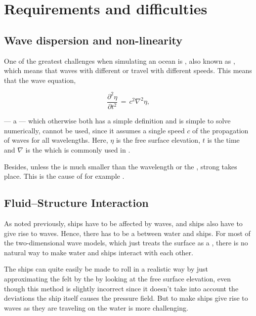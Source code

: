 \chapter{Requirements and difficulties}

\section{Wave dispersion and non-linearity}

One of the greatest challenges when simulating an ocean is , also known as , which means that waves with different \wavelengths or \frequencies travel with different speeds. This means that the wave equation,

\begin{equation} \label{eq:wave_equation}
\frac{\partial^2 \eta}{\partial t^2} \,=\, c^2\nabla^2\eta,
\end{equation}

--- a \PDE\xspace --- which otherwise both has a simple definition and is simple to solve numerically, cannot be used, since it assumes a single speed $c$ of the propagation of waves for all wavelengths. Here, $\eta$ is the free surface elevation, $t$ is the time and $\nabla$ is the  which is commonly used in .

Besides, unless the  is much smaller than the wavelength or the , strong  takes place. This is the cause of for example .

\section{Fluid--Structure Interaction}

As noted previously, ships have to be affected by waves, and ships also have to give rise to waves. Hence, there has to be a  between water and ships. For most of the two-dimensional wave models, which just treats the surface as a , there is no natural way to make water and ships interact with each other.

The ships can quite easily be made to roll in a realistic way by just approximating the  felt by the  by looking at the free surface elevation, even though this method is slightly incorrect since it doesn't take into account the deviations the ship itself causes the pressure field. But to make ships give rise to waves as they are traveling on the water is more challenging.

